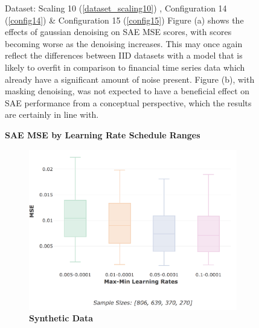 \documentclass[a4paper,11pt,oneside]{article}
\theoremstyle{plain}
\theoremstyle{definition}
\begin{document}
\begin{figure}[H]
	\caption[SAE MSE by Denoising Variance]
	{Dataset: Scaling 10 (\ref{dataset_scaling10}) , Configuration 14 (\ref{config14}) \& Configuration 15 (\ref{config15})
		\newline Figure (a) shows the effects of gaussian denoising on SAE MSE scores, with scores becoming worse as the denoising increases. This may once again reflect the differences between IID datasets with a model that is likely to overfit in comparison to financial time series data which already have a significant amount of noise present. Figure (b), with masking denoising, was not expected to have a beneficial effect on SAE performance from a conceptual perspective, which the results are certainly in line with. }
	\label{figure-results_mse_denoising}
\end{figure}

	
	\begin{figure}[H]
		\centering
		\textbf{SAE MSE by Learning Rate Schedule Ranges}
		\begin{subfigure}{.5\textwidth}
			\centering 
			\includegraphics[scale=0.3]{images/results/network/lr/synth_mse_minmax_lr.png}
			\caption{\textbf{Synthetic Data} 
				\newline }
			\label{figure-synth_mse_minmax_lr}
		\end{subfigure}%
		\begin{subfigure}{.5\textwidth}
			\centering 

\end{subfigure}
\end{figure}
\end{document}
